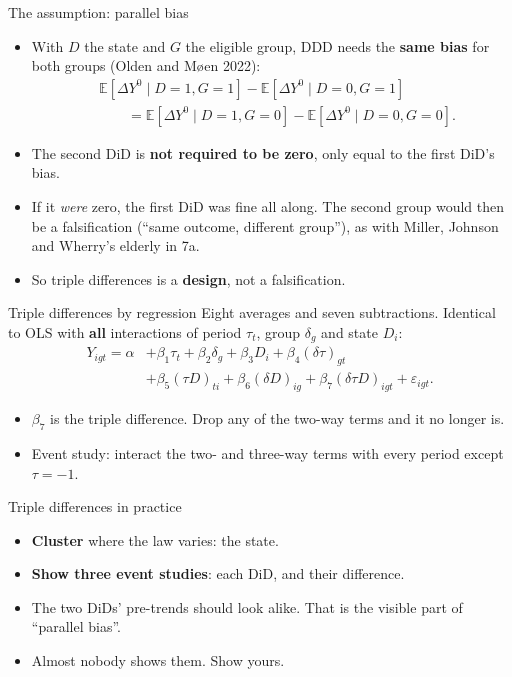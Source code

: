 \documentclass[
  11pt,
  ignorenonframetext,
  aspectratio=169,
]{beamer}
\providecommand{\tightlist}{%
  \setlength{\itemsep}{0pt}\setlength{\parskip}{0pt}}
\begin{document}
\begin{frame}{The assumption: parallel bias}
\protect{}\label{the-assumption-parallel-bias}
\begin{itemize}
\tightlist
\item
  With \(D\) the state and \(G\) the eligible group, DDD needs the
  \textbf{same bias} for both groups (Olden and Møen 2022): \[
  \begin{aligned}
  &\mathbb{E}[\Delta Y^0 \mid D=1, G=1] - \mathbb{E}[\Delta Y^0 \mid D=0, G=1] \\
  &\qquad = \mathbb{E}[\Delta Y^0 \mid D=1, G=0] - \mathbb{E}[\Delta Y^0 \mid D=0, G=0].
  \end{aligned}
  \]
\item
  The second DiD is \textbf{not required to be zero}, only equal to the
  first DiD's bias.
\item
  If it \emph{were} zero, the first DiD was fine all along. The second
  group would then be a falsification (``same outcome, different
  group''), as with Miller, Johnson and Wherry's elderly in 7a.
\item
  So triple differences is a \textbf{design}, not a falsification.
\end{itemize}
\end{frame}

\begin{frame}{Triple differences by regression}
\protect{}\label{triple-differences-by-regression}
Eight averages and seven subtractions. Identical to OLS with
\textbf{all} interactions of period \(\tau_t\), group \(\delta_g\) and
state \(D_i\): \[
\begin{aligned}
Y_{igt} = \alpha &+ \beta_1\tau_t + \beta_2 \delta_g + \beta_3 D_i + \beta_4(\delta\tau)_{gt} \\
&+ \beta_5(\tau D)_{ti} + \beta_6(\delta D)_{ig} + \beta_7(\delta \tau D)_{igt} + \varepsilon_{igt}.
\end{aligned}
\]

\begin{itemize}
\tightlist
\item
  \(\beta_7\) is the triple difference. Drop any of the two-way terms
  and it no longer is.
\item
  Event study: interact the two- and three-way terms with every period
  except \(\tau = -1\).
\end{itemize}
\end{frame}

\begin{frame}{Triple differences in practice}
\protect{}\label{triple-differences-in-practice}
\begin{itemize}
\tightlist
\item
  \textbf{Cluster} where the law varies: the state.
\item
  \textbf{Show three event studies}: each DiD, and their difference.
\item
  The two DiDs' pre-trends should look alike. That is the visible part
  of ``parallel bias''.
\item
  Almost nobody shows them. Show yours.
\end{itemize}
\end{frame}
\end{document}
